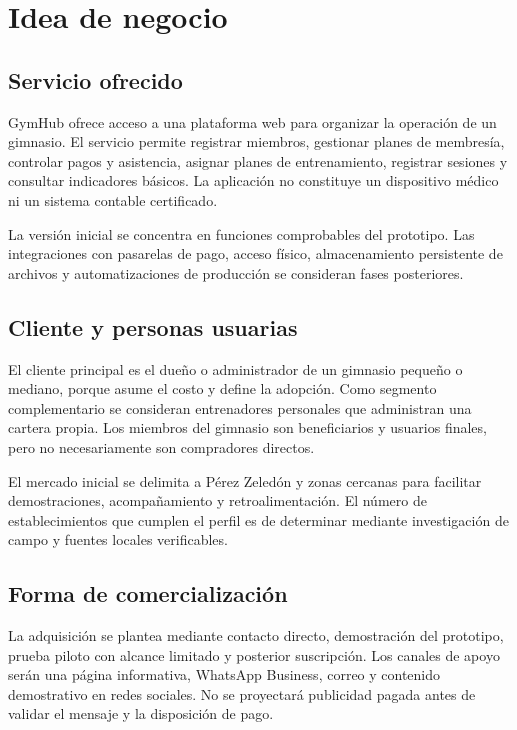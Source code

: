 \section{Idea de negocio}

\subsection{Servicio ofrecido}

GymHub ofrece acceso a una plataforma web para organizar la operación de un
gimnasio. El servicio permite registrar miembros, gestionar planes de membresía,
controlar pagos y asistencia, asignar planes de entrenamiento, registrar sesiones
y consultar indicadores básicos. La aplicación no constituye un dispositivo
médico ni un sistema contable certificado.

La versión inicial se concentra en funciones comprobables del prototipo. Las
integraciones con pasarelas de pago, acceso físico, almacenamiento persistente de
archivos y automatizaciones de producción se consideran fases posteriores.

\subsection{Cliente y personas usuarias}

El cliente principal es el dueño o administrador de un gimnasio pequeño o
mediano, porque asume el costo y define la adopción. Como segmento complementario
se consideran entrenadores personales que administran una cartera propia. Los
miembros del gimnasio son beneficiarios y usuarios finales, pero no necesariamente
son compradores directos.

El mercado inicial se delimita a Pérez Zeledón y zonas cercanas para facilitar
demostraciones, acompañamiento y retroalimentación. El número de establecimientos
que cumplen el perfil es \pendiente{} de determinar mediante investigación de
campo y fuentes locales verificables.

\subsection{Forma de comercialización}

La adquisición se plantea mediante contacto directo, demostración del prototipo,
prueba piloto con alcance limitado y posterior suscripción. Los canales de apoyo
serán una página informativa, WhatsApp Business, correo y contenido demostrativo
en redes sociales. No se proyectará publicidad pagada antes de validar el mensaje
y la disposición de pago.

